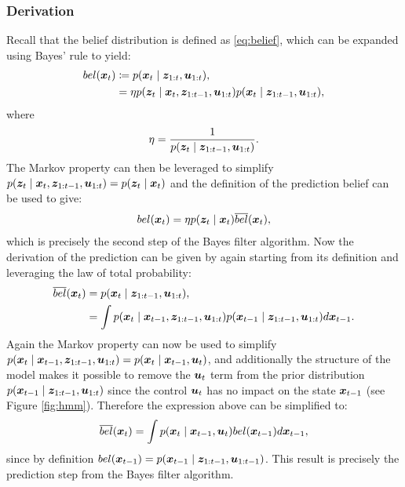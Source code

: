\subsubsection{Derivation}
Recall that the belief distribution is defined as \eqref{eq:belief}, which can be expanded using Bayes' rule to yield:
\begin{equation*}
\begin{split}
bel(\bm{x}_t) &\coloneqq p(\bm{x}_t\mid \bm{z}_{1:t}, \bm{u}_{1:t}), \\
&=\eta p(\bm{z}_{t}\mid \bm{x}_{t},\bm{z}_{1:t-1},\bm{u}_{1:t})p(\bm{x}_{t}\mid \bm{z}_{1:t-1},\bm{u}_{1:t}),
\end{split}
\end{equation*}
where
\begin{equation*}
    \eta = \frac{1}{p(\bm{z}_{t}\mid \bm{z}_{1:t-1},\bm{u}_{1:t})}.
\end{equation*}
The Markov property can then be leveraged to simplify $p(\bm{z}_{t}\mid \bm{x}_{t},\bm{z}_{1:t-1},\bm{u}_{1:t}) = p(\bm{z}_{t}\mid \bm{x}_{t})$ and the definition of the prediction belief can be used to give:
\begin{equation*}
\begin{split}
bel(\bm{x}_t) = \eta p(\bm{z}_{t}\mid \bm{x}_{t}) \overline{bel}(\bm{x}_t),
\end{split}
\end{equation*}
which is precisely the second step of the Bayes filter algorithm. Now the derivation of the prediction can be given by again starting from its definition and leveraging the law of total probability:
\begin{equation*}
\begin{split}
 \overline{bel}(\bm{x}_t) &= p(\bm{x}_{t}\mid \bm{z}_{1:t-1},\bm{u}_{1:t}), \\ 
 &= \int p(\bm{x}_{t}\mid \bm{x}_{t-1},\bm{z}_{1:t-1},\bm{u}_{1:t}) p(\bm{x}_{t-1}\mid \bm{z}_{1:t-1},\bm{u}_{1:t}) d\bm{x}_{t-1}.
\end{split}
\end{equation*}
Again the Markov property can now be used to simplify $p(\bm{x}_{t}\mid \bm{x}_{t-1},\bm{z}_{1:t-1},\bm{u}_{1:t}) = p(\bm{x}_{t}\mid \bm{x}_{t-1},\bm{u}_{t})$, and additionally the structure of the model makes it possible to remove the $\bm{u}_t$ term from the prior distribution $p(\bm{x}_{t-1}\mid \bm{z}_{1:t-1},\bm{u}_{1:t})$ since the control $\bm{u}_t$ has no impact on the state $\bm{x}_{t-1}$ (see Figure \ref{fig:hmm}). Therefore the expression above can be simplified to:
\begin{equation*}
\begin{split}
 \overline{bel}(\bm{x}_t) = \int p(\bm{x}_{t}\mid \bm{x}_{t-1},\bm{u}_{t}) bel(\bm{x}_{t-1}) d\bm{x}_{t-1},
\end{split}
\end{equation*}
since by definition $bel(\bm{x}_{t-1}) = p(\bm{x}_{t-1}\mid \bm{z}_{1:t-1}, \bm{u}_{1:t-1})$. This result is precisely the prediction step from the Bayes filter algorithm.

